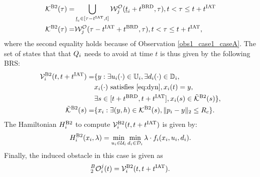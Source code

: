 \begin{itemize}[leftmargin=*]
\begin{equation}
\begin{aligned}
\mathcal{K}^{\text{B2}}(\tau) = & \bigcup_{\underline{t}_i \in [\tau-t^\text{IAT}, t]} \mathcal{W}_{j}^{\mathcal{O}}(\underline{t}_i + t^\text{BRD}, \tau), t < \tau \leq t + t^\text{IAT}\\
\mathcal{K}^{\text{B2}}(\tau) = & \mathcal{W}_{j}^{\mathcal{O}}(\tau-t^\text{IAT}+t^\text{BRD}, \tau), t < \tau \leq t + t^\text{IAT},
\end{aligned}
\end{equation}
where the second equality holds because of Observation \ref{obs1_case1_caseA}. The set of states that that $Q_i$ needs to avoid at time $t$ is thus given by the following BRS:  
\begin{equation} \label{eq:ObsBRS_case2_caseB}
\begin{aligned}
\brs^{\text{B2}}_{i}(t, t+\iat) = & \{y: \exists \ctrl_i(\cdot) \in \cfset_i, \exists \dstb_i(\cdot) \in \dfset_i, \\
& \state_i(\cdot) \text{ satisfies \eqref{eq:dyn}}, \state_i(t) = y, \\
& \exists s \in [t+\brd, t+\iat], \state_i(s) \in \tilde{\mathcal{K}}^{\text{B2}}(s) \},\\
\tilde{\mathcal{K}}^{\text{B2}}(s) = & \{\state_i: \exists (y, h) \in \mathcal{K}^{\text{B2}}(s), \|\pos_i - y\|_2 \le \rc \}.
\end{aligned}
\end{equation}
The Hamiltonian $H^{\text{B2}}_{i}$ to compute $\mathcal{V}^{\text{B2}}_{i}(t, t+t^\text{IAT})$ is given by:
\begin{equation} \label{eqn:BRS_obsham_case2_caseB}
\ham^{\text{B2}}_{i}(\state_i, \costate) = \min_{\ctrl_i \in \cset_i} \min_{\dstb_i \in \dset_i} \costate \cdot f_i (\state_i, \ctrl_i, \dstb_i).
\end{equation}
Finally, the induced obstacle in this case is given as
\begin{equation} \label{eq:intruderObs_case2_caseB}
_2^B\ioset_i^j(t) = \brs^{\text{B2}}_{i}(t, t+\iat).
\end{equation}
\end{itemize}